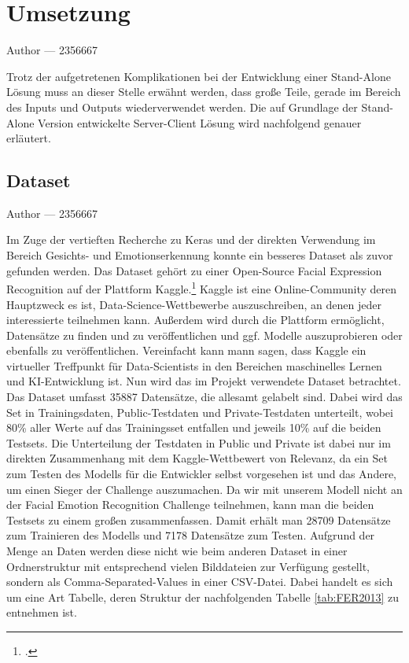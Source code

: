 \documentclass[12pt, a4paper]{report}
\makeatletter
\newcommand{\sectionauthor}[1]{%
  {\parindent0pt\vspace*{-5pt}%
  \large{Author --- }
  \linespread{1.1}\large\scshape#1%
  \par\nobreak\vspace*{35pt} }
  \@afterheading%
}
\makeatother
\begin{document}
\section{Umsetzung}
\sectionauthor{2356667}
Trotz der aufgetretenen Komplikationen bei der Entwicklung einer Stand-Alone Lösung muss an dieser Stelle erwähnt werden, dass große Teile, gerade im Bereich des Inputs und Outputs wiederverwendet werden. Die auf Grundlage der Stand-Alone Version entwickelte Server-Client Lösung wird nachfolgend genauer erläutert.

\subsection{Dataset}
\label{secondDataSet}
\sectionauthor{2356667}
Im Zuge der vertieften Recherche zu Keras und der direkten Verwendung im Bereich Gesichts- und Emotionserkennung konnte ein besseres Dataset als zuvor gefunden werden. Das Dataset gehört zu einer Open-Source Facial Expression Recognition auf der Plattform Kaggle.\footcite[Vgl.][]{FER-Challenge} Kaggle ist eine Online-Community deren Hauptzweck es ist, Data-Science-Wettbewerbe auszuschreiben, an denen jeder interessierte teilnehmen kann. Außerdem wird durch die Plattform ermöglicht, Datensätze zu finden und zu veröffentlichen und ggf. Modelle auszuprobieren oder ebenfalls zu veröffentlichen. Vereinfacht kann mann sagen, dass Kaggle ein virtueller Treffpunkt für Data-Scientists in den Bereichen maschinelles Lernen und KI-Entwicklung ist.\newline
Nun wird das im Projekt verwendete Dataset betrachtet. Das Dataset umfasst 35887 Datensätze, die allesamt gelabelt sind. Dabei wird das Set in Trainingsdaten, Public-Testdaten und Private-Testdaten unterteilt, wobei 80\% aller Werte auf das Trainingsset entfallen und jeweils 10\% auf die beiden Testsets. Die Unterteilung der Testdaten in Public und Private ist dabei nur im direkten Zusammenhang mit dem Kaggle-Wettbewert von Relevanz, da ein Set zum Testen des Modells für die Entwickler selbst vorgesehen ist und das Andere, um einen Sieger der Challenge auszumachen. Da wir mit unserem Modell nicht an der Facial Emotion Recognition Challenge teilnehmen, kann man die beiden Testsets zu einem großen zusammenfassen. Damit erhält man 28709 Datensätze zum Trainieren des Modells und 7178 Datensätze zum Testen. Aufgrund der Menge an Daten werden diese nicht wie beim anderen Dataset in einer Ordnerstruktur mit entsprechend vielen Bilddateien zur Verfügung gestellt, sondern als Comma-Separated-Values in einer CSV-Datei. Dabei handelt es sich um eine Art Tabelle, deren Struktur der nachfolgenden Tabelle \ref{tab:FER2013} zu entnehmen ist.
\end{document}
